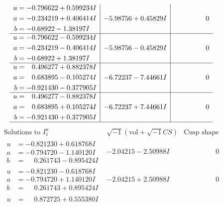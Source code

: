 \documentclass[1p]{elsarticle_modified}
\theoremstyle{definition}
\newcommand{\I}{\sqrt{-1}}
\begin{document}
$$\begin{array}{c|c|c}
\begin{aligned}
u &= -0.796622 + 0.599234 I \\
a &= -0.234219 + 0.406414 I \\
b &= -0.68922 - 1.38197 I\end{aligned}
 & -5.98756 + 0.45829 I & \phantom{-0.000000 } 0 \\ \hline\begin{aligned}
u &= -0.796622 - 0.599234 I \\
a &= -0.234219 - 0.406414 I \\
b &= -0.68922 + 1.38197 I\end{aligned}
 & -5.98756 - 0.45829 I & \phantom{-0.000000 } 0 \\ \hline\begin{aligned}
u &= \phantom{-}0.496277 + 0.882378 I \\
a &= \phantom{-}0.683895 - 0.105274 I \\
b &= -0.921430 - 0.377905 I\end{aligned}
 & -6.72237 - 7.44661 I & \phantom{-0.000000 } 0 \\ \hline\begin{aligned}
u &= \phantom{-}0.496277 - 0.882378 I \\
a &= \phantom{-}0.683895 + 0.105274 I \\
b &= -0.921430 + 0.377905 I\end{aligned}
 & -6.72237 + 7.44661 I & \phantom{-0.000000 } 0\\
 \hline 
 \end{array}$$\newpage$$\begin{array}{c|c|c}  
\text{Solutions to }I^u_{1}& \I (\text{vol} + \sqrt{-1}CS) & \text{Cusp shape}\\
 \hline 
\begin{aligned}
u &= -0.821230 + 0.618768 I \\
a &= -0.794720 - 1.140120 I \\
b &= \phantom{-}0.261743 - 0.895424 I\end{aligned}
 & -2.04215 - 2.50988 I & \phantom{-0.000000 } 0 \\ \hline\begin{aligned}
u &= -0.821230 - 0.618768 I \\
a &= -0.794720 + 1.140120 I \\
b &= \phantom{-}0.261743 + 0.895424 I\end{aligned}
 & -2.04215 + 2.50988 I & \phantom{-0.000000 } 0 \\ \hline\begin{aligned}
u &= \phantom{-}0.872725 + 0.555380 I \\

\end{aligned}
\end{array}$$
\end{document}
